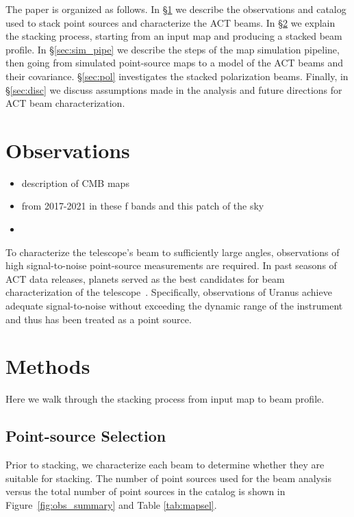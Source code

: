The paper is organized as follows. 
In \S\ref{sec:obs} we describe the observations and catalog used to stack point sources and characterize the ACT beams.  In \S\ref{sec:stack} we explain the stacking process, starting from an input map and producing a stacked beam profile.  In \S\ref{sec:sim_pipe} we describe the steps of the map simulation pipeline, then going from simulated point-source maps to a model of the ACT beams and their covariance.  \S\ref{sec:pol} investigates the stacked polarization beams.  Finally, in \S\ref{sec:disc} we discuss assumptions made in the analysis and future directions for ACT beam characterization.

\section{Observations}
\label{sec:obs}
\begin{itemize}
    \item description of CMB maps
    \item from 2017-2021 in these f bands and this patch of the sky
    \item 
\end{itemize}
To characterize the telescope's beam to sufficiently large angles, observations of high signal-to-noise point-source measurements are required.  In past seasons of ACT data releases, planets served as the best candidates for beam characterization of the telescope~\cite{Lungu_2022}.  Specifically, observations of Uranus achieve adequate signal-to-noise without exceeding the dynamic range of the instrument and thus has been treated as a point source.
\section{Methods}
\label{sec:stack}
Here we walk through the stacking process from input map to beam profile.  

\subsection{Point-source Selection}
\label{subsec:filt}
Prior to stacking, we characterize each beam to determine whether they are suitable for stacking.  The number of point sources used for the beam analysis versus the total number of point sources in the catalog is shown in Figure~\ref{fig:obs_summary} and Table \ref{tab:mapsel}.

